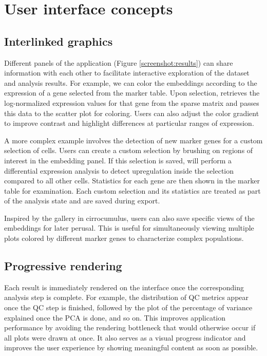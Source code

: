 \documentclass{article}
\begin{document}
\section{User interface concepts}

\subsection{Interlinked graphics}

Different panels of the  application (Figure \ref{screenshot:results}) can share information with each other to facilitate interactive exploration of the dataset and analysis results.
For example, we can color the embeddings according to the expression of a gene selected from the marker table.
Upon selection,  retrieves the log-normalized expression values for that gene from the sparse matrix and passes this data to the scatter plot for coloring.
Users can also adjust the color gradient to improve contrast and highlight differences at particular ranges of expression.

A more complex example involves the detection of new marker genes for a custom selection of cells.
Users can create a custom selection by brushing on regions of interest in the embedding panel.
If this selection is saved,  will perform a differential expression analysis to detect upregulation inside the selection compared to all other cells.
Statistics for each gene are then shown in the marker table for examination.
Each custom selection and its statistics are treated as part of the analysis state and are saved during export.

Inspired by the gallery in cirrocumulus, users can also save specific views of the embeddings for later perusal.
This is useful for simultaneously viewing multiple plots colored by different marker genes to characterize complex populations.

\subsection{Progressive rendering}

Each result is immediately rendered on the interface once the corresponding analysis step is complete.
For example, the distribution of QC metrics appear once the QC step is finished, followed by the plot of the percentage of variance explained once the PCA is done, and so on.
This improves application performance by avoiding the rendering bottleneck that would otherwise occur if all plots were drawn at once. 
It also serves as a visual progress indicator and improves the user experience by showing meaningful content as soon as possible.
\end{document}
